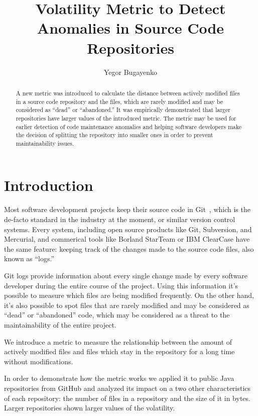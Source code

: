 \documentclass[sigconf]{acmart}
\title{Volatility Metric to Detect Anomalies in Source Code Repositories}
\author{Yegor Bugayenko}{}{}
\affiliation{%
  \institution{Huawei Technologies Co., Ltd.}
  \city{Moscow, Russia}
}
\begin{document}
\begin{abstract}
A new metric was introduced to calculate the distance
between actively modified files in a source code repository
and the files, which are rarely modified and may be considered
as ``dead'' or ``abandoned.'' It was empirically demonstrated that larger repositories
have larger values of the introduced metric.
The metric may be used for earlier detection of code maintenance anomalies
and helping software developers make the decision of splitting the repository
into smaller ones in order to prevent maintainability issues.
\end{abstract}
\maketitle

\section{Introduction}

Most software development projects keep their source code in Git~\citep{loeliger2012},
which is the de-facto standard in the industry at the moment, or similar
version control systems. Every system, including open
source products like Git, Subversion, and Mercurial, and commerical tools
like Borland StarTeam\texttrademark{} or IBM ClearCase\texttrademark{}
have the same feature: keeping track of the changes
made to the source code files, also known as ``logs.''

Git logs provide information about every single change made by every software
developer during the entire course of the project. Using this information
it's possible to measure which files are being modified frequently. On the
other hand, it's also possible to spot files that are rarely modified and may
be considered as ``dead'' or ``abandoned'' code, which may be considered as a threat
to the maintainability of the entire project.

We introduce a metric to measure the relationship
between the amount of actively modified files and files which stay
in the repository for a long time without modifications.

In order to demonstrate how the metric works we applied it to
\thetotalrepos{} public Java repositories from GitHub and analyzed
its impact on a two other characteristics of each repository:
the number of files in a repository and the size of it in bytes.
Larger repositories shown larger values of the volatility.
\end{document}

